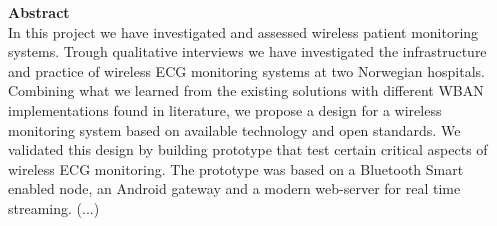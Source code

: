 \noindent \textbf{Abstract}
\\
\newline	
\noindent
In this project we have investigated and assessed wireless patient monitoring systems. Trough qualitative interviews we have investigated the infrastructure and practice of wireless ECG monitoring systems at two Norwegian hospitals. Combining what we learned from the existing solutions with different WBAN implementations found in literature, we propose a design for a wireless monitoring system based on available technology and open standards. We validated this design by building prototype that test certain critical aspects of wireless ECG monitoring. The prototype was based on a Bluetooth Smart enabled node, an Android gateway and a modern web-server for real time streaming. (...)
